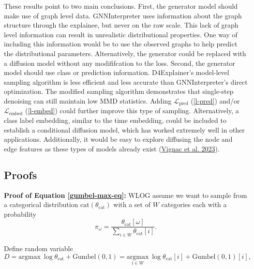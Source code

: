 \documentclass[
  11pt,
  letterpaper,
]{article}
\begin{document}
\quad These results point to two main conclusions. First, the generator
model should make use of graph level data. GNNInterpreter uses
information about the graph structure through the explainee, but never
on the raw scale. This lack of graph level information can result in
unrealistic distributional properties. One way of including this
information would be to use the observed graphs to help predict the
distributional parameters. Alternatively, the generator could be
replaced with a diffusion model without any modififcation to the loss.
Second, the generator model should use class or prediction information.
D4Explainer's model-level sampling algorithm is less efficient and less
accurate than GNNInterpreter's direct optimization. The modified
sampling algorithm demonstrates that single-step denoising can still
maintain low MMD statistics. Adding \(\mathcal{L}_\text{pred}\)
(\ref{l-pred}) and/or \(\mathcal{L}_\text{embed}\) (\ref{l-embed}) could
further improve this type of sampling. Alternatively, a class label
embedding, similar to the time embedding, could be included to establish
a conditional diffusion model, which has worked extremely well in other
applications. Additionally, it would be easy to explore diffusing the
node and edge features as these types of models already exist
(\protect\hyperlink{ref-Vignac_Krawczuk_Siraudin_Wang_Cevher_Frossard_2023}{Vignac
et al. 2023}).

\hypertarget{sec-proof}{%
\subsection{Proofs}\label{sec-proof}}

\textbf{Proof of Equation \ref{gumbel-max-eq}:} WLOG assume we want to
sample from a categorical distribution \(\text{cat}(\theta_\text{cat})\)
with a set of \(W\) categories each with a probability \[
\pi_\omega = \dfrac{\theta_\text{cat}[\omega]}{\sum_{i \in W}\theta_\text{cat}[i]}.
\]

Define random variable \[
D = \text{argmax} \ \log \theta_\text{cat} + \text{Gumbel}(0, 1) = \underset{i \in W}{\text{argmax}} \ \log \theta_\text{cat}[i] + \text{Gumbel}(0, 1)[i], 
\]
\end{document}
